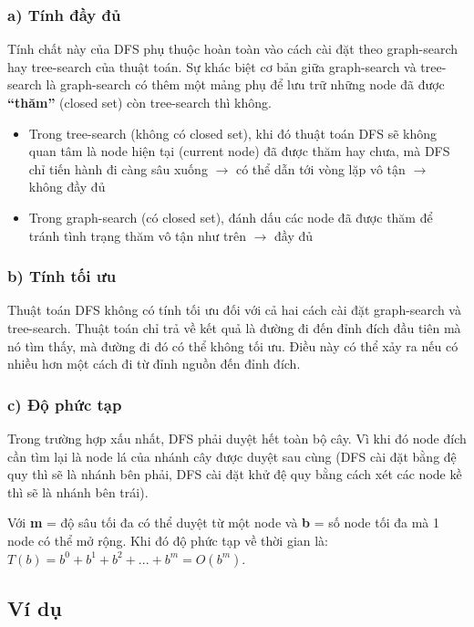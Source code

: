 \subsubsection{a) Tính đầy đủ}
\hspace{0.42cm}Tính chất này của DFS phụ thuộc hoàn toàn vào cách cài đặt theo graph-search hay tree-search của thuật toán. Sự khác biệt cơ bản giữa graph-search và tree-search là graph-search có thêm một mảng phụ để lưu trữ những node đã được \textbf{“thăm”} (closed set) còn tree-search thì không. 
\begin{itemize}
    \item Trong tree-search (không có closed set), khi đó thuật toán DFS sẽ không quan tâm là node hiện tại (current node) đã được thăm hay chưa, mà DFS chỉ tiến hành đi càng sâu xuống $\rightarrow$ có thể dẫn tới vòng lặp vô tận $\rightarrow$ không đầy đủ
    \item Trong graph-search (có closed set), đánh dấu các node đã được thăm để tránh tình trạng thăm vô tận như trên $\rightarrow$ đầy đủ
\end{itemize}
\subsubsection{b) Tính tối ưu}
\hspace{0.42cm}Thuật toán DFS không có tính tối ưu đối với cả hai cách cài đặt graph-search và tree-search. Thuật toán chỉ trả về kết quả là đường đi đến đỉnh đích đầu tiên mà nó tìm thấy, mà đường đi đó có thể không tối ưu. Điều này có thể xảy ra nếu có nhiều hơn một cách đi từ đỉnh nguồn đến đỉnh đích.
\subsubsection{c) Độ phức tạp}
\hspace{0.42cm}Trong trường hợp xấu nhất, DFS phải duyệt hết toàn bộ cây. Vì khi đó node đích cần tìm lại là node lá của nhánh cây được duyệt sau cùng (DFS cài đặt bằng đệ quy thì sẽ là nhánh bên phải, DFS cài đặt khử đệ quy bằng cách xét các node kề thì sẽ là nhánh bên trái).

\hspace{0.42cm}Với \textbf{m} = độ sâu tối đa có thể duyệt từ một node và \textbf{b} = số node tối đa mà 1 node có thể mở rộng. Khi đó độ phức tạp về thời gian là: $T(b)= b^0 + b^1 + b^2 +...+ b^m = O(b^m)$.

\subsection{Ví dụ}

